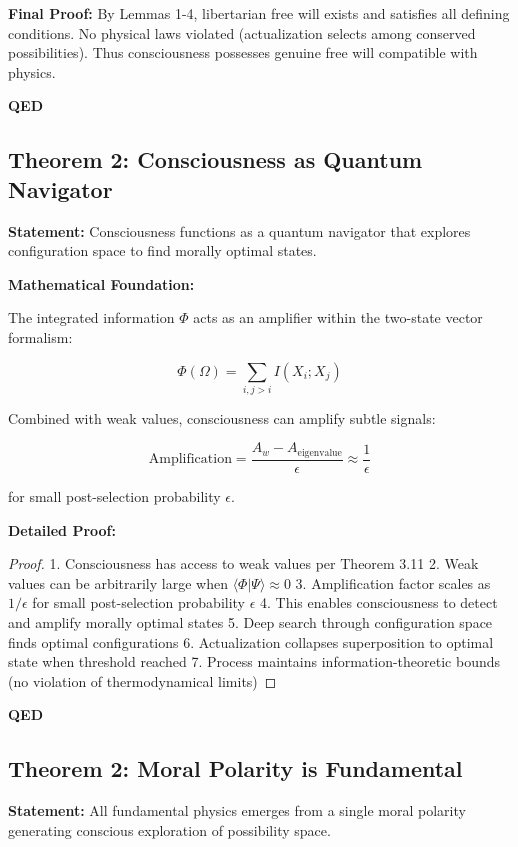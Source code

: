 \documentclass[12pt,a4paper]{article}
\theoremstyle{definition}
\begin{document}
{\bf Final Proof:} By Lemmas 1-4, libertarian free will exists and satisfies all defining conditions. No physical laws violated (actualization selects among conserved possibilities). Thus consciousness possesses genuine free will compatible with physics.

{\bf QED}

\subsection{Theorem 2: Consciousness as Quantum Navigator}
{\bf Statement:} Consciousness functions as a quantum navigator that explores configuration space to find morally optimal states.

{\bf Mathematical Foundation:}

The integrated information $\Phi$ acts as an amplifier within the two-state vector formalism:

\begin{equation}
\Phi(\Omega) = \sum_{i,j>i} I(X_i; X_j)
\end{equation}

Combined with weak values, consciousness can amplify subtle signals:

\begin{equation}
\text{Amplification} = \frac{A_w - A_{\text{eigenvalue}}}{\epsilon} \approx \frac{1}{\epsilon}
\end{equation}

for small post-selection probability $\epsilon$.

{\bf Detailed Proof:}
\begin{proof}
1. Consciousness has access to weak values per Theorem 3.11
2. Weak values can be arbitrarily large when $\langle\Phi|\Psi\rangle \approx 0$
3. Amplification factor scales as $1/\epsilon$ for small post-selection probability $\epsilon$
4. This enables consciousness to detect and amplify morally optimal states
5. Deep search through configuration space finds optimal configurations
6. Actualization collapses superposition to optimal state when threshold reached
7. Process maintains information-theoretic bounds (no violation of thermodynamical limits)
\end{proof}

{\bf QED}

\subsection{Theorem 2: Moral Polarity is Fundamental}
{\bf Statement:} All fundamental physics emerges from a single moral polarity generating conscious exploration of possibility space.
\end{document}
